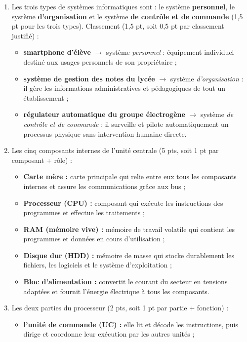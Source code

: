 \documentclass[11pt]{article}
\begin{document}
\begin{corrige}
\begin{enumerate}
\item Les trois types de systèmes informatiques sont : le système \textbf{personnel}, le système \textbf{d'organisation} et le système \textbf{de contrôle et de commande} (1,5 pt pour les trois types). Classement (1,5 pt, soit 0,5 pt par classement justifié) :
\begin{itemize}
\item \textbf{smartphone d'élève} $\rightarrow$ système \emph{personnel} : équipement individuel destiné aux usages personnels de son propriétaire ;
\item \textbf{système de gestion des notes du lycée} $\rightarrow$ système \emph{d'organisation} : il gère les informations administratives et pédagogiques de tout un établissement ;
\item \textbf{régulateur automatique du groupe électrogène} $\rightarrow$ système \emph{de contrôle et de commande} : il surveille et pilote automatiquement un processus physique sans intervention humaine directe.
\end{itemize}
\item Les cinq composants internes de l'unité centrale (5 pts, soit 1 pt par composant + rôle) :
\begin{itemize}
\item \textbf{Carte mère :} carte principale qui relie entre eux tous les composants internes et assure les communications grâce aux bus ;
\item \textbf{Processeur (CPU) :} composant qui exécute les instructions des programmes et effectue les traitements ;
\item \textbf{RAM (mémoire vive) :} mémoire de travail volatile qui contient les programmes et données en cours d'utilisation ;
\item \textbf{Disque dur (HDD) :} mémoire de masse qui stocke durablement les fichiers, les logiciels et le système d'exploitation ;
\item \textbf{Bloc d'alimentation :} convertit le courant du secteur en tensions adaptées et fournit l'énergie électrique à tous les composants.
\end{itemize}
\item Les deux parties du processeur (2 pts, soit 1 pt par partie + fonction) :
\begin{itemize}
\item \textbf{l'unité de commande (UC) :} elle lit et décode les instructions, puis dirige et coordonne leur exécution par les autres unités ;

\end{itemize}
\end{enumerate}
\end{corrige}
\end{document}
